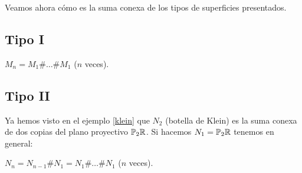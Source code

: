 \documentclass[GTSResumen.tex]{subfiles}
\begin{document}
Veamos ahora cómo es la suma conexa de los tipos de superficies presentados.

\subsection{Tipo I}
\begin{comment}
\begin{flushleft}
$M_2\equiv$ Pegar dos toros ($M_1$) con un agujero por el borde del agujero.\\
$\ \vdots$\\
$M_n\equiv$ Pegar $M_{n-1}$ con agujero con $M_1$ con aujero por el borde del agujero. Es decir, 

\end{flushleft}
\end{comment}
$M_n=M_1\#\dots\# M_1$  ($n$ veces).


\subsection{Tipo II}

Ya hemos visto en el ejemplo \ref{klein} que $N_2$ (botella de Klein) es la suma conexa de dos copias del plano proyectivo $\mathbb{P}_2\mathbb{R}$. Si hacemos $N_1=\mathbb{P}_2\mathbb{R}$ tenemos en general:

\begin{flushleft}
$N_n=N_{n-1}\#N_1=N_1\#\dots\# N_1$ ($n$ veces).


\end{flushleft}
\end{document}
